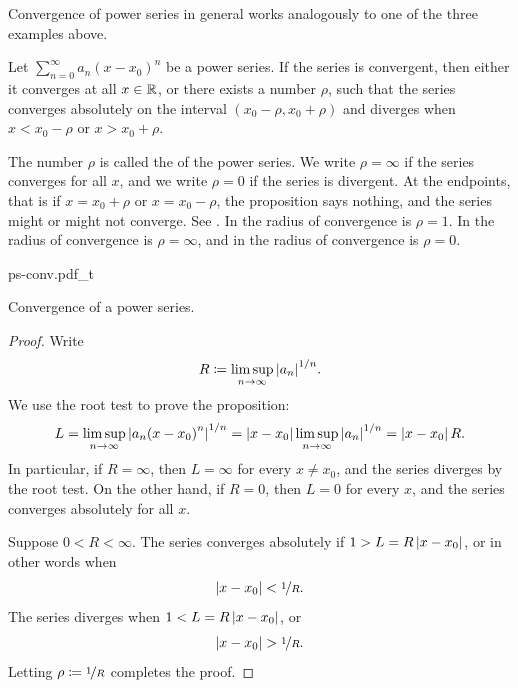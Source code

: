 Convergence of power series in general works analogously to
one of the three examples above.

\begin{prop} \label{prop:powerserrealradius}
Let $\sum_{n=0}^\infty a_n {(x-x_0)}^n$ be a power series.
If the series is convergent, then either it converges at
all $x \in {\mathbb{R}}$, or
there exists a number $\rho$, such that
the series converges absolutely on the interval
$(x_0-\rho,x_0+\rho)$ and diverges when $x < x_0-\rho$ or $x > x_0+\rho$.
\end{prop}

The number $\rho$ is called the \emph{} of the
power series.  We write $\rho = \infty$ if the series converges for
all $x$, and we write $\rho = 0$ if the series is divergent.
At the endpoints, that is if $x = x_0+\rho$ or $x = x_0-\rho$,
the proposition says nothing,
and the series might or might not converge.
See .
In 
the radius of convergence is $\rho=1$.
In  the radius of convergence is $\rho=\infty$,
and in  the radius of convergence is $\rho=0$.

\begin{myfigureht}
{ps-conv.pdf_t}
\caption{Convergence of a power series.\label{ps:convfig}}
\end{myfigureht}

\begin{proof}
Write
\begin{equation*}
R \coloneqq \limsup_{n\to\infty} {\left\lvert {a_n} \right\rvert}^{1/n} .
\end{equation*}
We use the root test to prove the proposition:
\begin{equation*}
L = \limsup_{n\to\infty} {\left\lvert {a_n {(x-x_0)}^n} \right\rvert}^{1/n} 
=
\left\lvert {x-x_0} \right\rvert \limsup_{n\to\infty} {\left\lvert {a_n} \right\rvert}^{1/n}
=
\left\lvert {x-x_0} \right\rvert R .
\end{equation*}
In particular, if $R = \infty$, then $L=\infty$ for every $x \not= x_0$, and
the series diverges by the root test.
On the other hand,
if $R = 0$, then $L=0$ for every $x$,
and the series converges absolutely for all $x$.

Suppose $0 < R < \infty$.
The series
converges absolutely if
$1 > L = R \left\lvert {x-x_0} \right\rvert$,
or in other words when
\begin{equation*}
\left\lvert {x-x_0} \right\rvert < \nicefrac{1}{R} .
\end{equation*}
The series diverges when
$1 < L = R \left\lvert {x-x_0} \right\rvert$,
or
\begin{equation*}
\left\lvert {x-x_0} \right\rvert > \nicefrac{1}{R} .
\end{equation*}
Letting $\rho \coloneqq \nicefrac{1}{R}$ completes the proof.
\end{proof}

